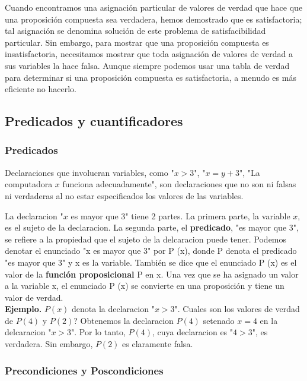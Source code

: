 \documentclass[]{article}
\begin{document}
Cuando encontramos una asignación particular de valores de verdad que hace que una proposición compuesta sea verdadera, hemos demostrado que es satisfactoria; tal asignación se denomina solución de este problema de satisfacibilidad particular. Sin embargo, para mostrar que una proposición compuesta es insatisfactoria, necesitamos mostrar que toda asignación de valores de verdad a sus variables la hace falsa. Aunque siempre podemos usar una tabla de verdad para determinar si una proposición compuesta es satisfactoria, a menudo es más eficiente no hacerlo.

\subsection{Predicados y cuantificadores}

\subsubsection*{Predicados}

Declaraciones que involucran variables, como "$x > 3$", "$x = y + 3$", "La computadora $x$ funciona adecuadamente", son declaraciones que no son ni falsas ni verdaderas al no estar especificados los valores de las variables.

La declaracion "$x$ es mayor que 3" tiene 2 partes. La primera parte, la variable $x$, es el sujeto de la declaracion. La segunda parte, el \textbf{predicado}, "es mayor que 3", se refiere a la propiedad que el sujeto de la delcaracion puede tener.  Podemos denotar el enunciado "x es mayor que 3" por P (x), donde P denota el predicado "es mayor que 3" y x es la variable. También se dice que el enunciado P (x) es el valor de la \textbf{función proposicional} P en x. Una vez que se ha asignado un valor a la variable x, el enunciado P (x) se convierte en una proposición y tiene un valor de verdad.\\

\textbf{Ejemplo.} $P(x)$ denota la declaracion "$x > 3$". Cuales son los valores de verdad de $P(4)$ y $P(2)$?
Obtenemos la declaracion $P(4)$ setenado $x = 4$ en la delcaracion "$x > 3$". Por lo tanto, $P(4)$, cuya declaracion es "$4 > 3$", es verdadera. Sin embargo, $P(2)$ es claramente falsa.

\subsubsection*{Precondiciones y Poscondiciones}
\end{document}
